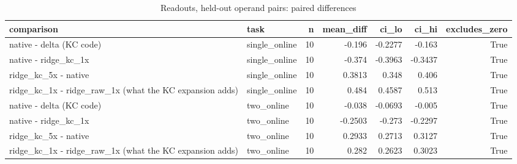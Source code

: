 \begin{table}[t]
\centering
\small
\begin{tabular}{llrrrrr}
\toprule
comparison & task & n & mean\_diff & ci\_lo & ci\_hi & excludes\_zero \\
\midrule
native - delta (KC code) & single\_online & 10 & -0.196 & -0.2277 & -0.163 & True \\
native - ridge\_kc\_1x & single\_online & 10 & -0.374 & -0.3963 & -0.3437 & True \\
ridge\_kc\_5x - native & single\_online & 10 & 0.3813 & 0.348 & 0.406 & True \\
ridge\_kc\_1x - ridge\_raw\_1x (what the KC expansion adds) & single\_online & 10 & 0.484 & 0.4587 & 0.513 & True \\
native - delta (KC code) & two\_online & 10 & -0.038 & -0.0693 & -0.005 & True \\
native - ridge\_kc\_1x & two\_online & 10 & -0.2503 & -0.273 & -0.2297 & True \\
ridge\_kc\_5x - native & two\_online & 10 & 0.2933 & 0.2713 & 0.3127 & True \\
ridge\_kc\_1x - ridge\_raw\_1x (what the KC expansion adds) & two\_online & 10 & 0.282 & 0.2623 & 0.3023 & True \\
\bottomrule
\end{tabular}
\caption{Readouts, held-out operand pairs: paired differences}
\label{tab:disjoint_readouts_paired}
\end{table}